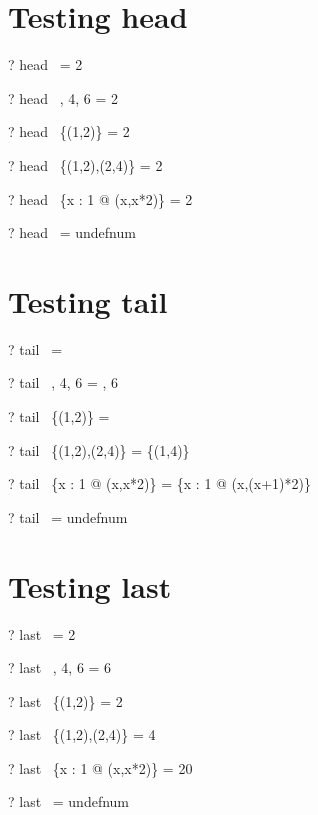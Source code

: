 \documentclass{article}
\begin{document}
\section{Testing head}
\begin{zed} \vdash? head~  \rangle = 2 \end{zed}
\begin{zed} \vdash? head~ , 4, 6 \rangle = 2 \end{zed}
\begin{zed} \vdash? head~ \{(1,2)\} = 2 \end{zed}
\begin{zed} \vdash? head~ \{(1,2),(2,4)\} = 2 \end{zed}
\begin{zed} \vdash? head~ \{x : 1  @ (x,x*2)\} = 2 \end{zed}
\begin{zed} \vdash? head~ \langle \rangle = undefnum \end{zed}

\section{Testing tail}
\begin{zed} \vdash? tail~  \rangle = \emptyset \end{zed}
\begin{zed} \vdash? tail~ , 4, 6 \rangle = , 6 \rangle \end{zed}
\begin{zed} \vdash? tail~ \{(1,2)\} = \emptyset \end{zed}
\begin{zed} \vdash? tail~ \{(1,2),(2,4)\} = \{(1,4)\} \end{zed}
\begin{zed} \vdash? tail~ \{x : 1  @ (x,x*2)\} = \{x : 1  @ (x,(x+1)*2)\} \end{zed}
\begin{zed} \vdash? tail~ \emptyset[(\nat,\num)] = undefnum \end{zed}

\section{Testing last}
\begin{zed} \vdash? last~  \rangle = 2 \end{zed}
\begin{zed} \vdash? last~ , 4, 6 \rangle = 6 \end{zed}
\begin{zed} \vdash? last~ \{(1,2)\} = 2 \end{zed}
\begin{zed} \vdash? last~ \{(1,2),(2,4)\} = 4 \end{zed}
\begin{zed} \vdash? last~ \{x : 1  @ (x,x*2)\} = 20 \end{zed}
\begin{zed} \vdash? last~ \emptyset[(\nat,\num)] = undefnum \end{zed}
\end{document}
